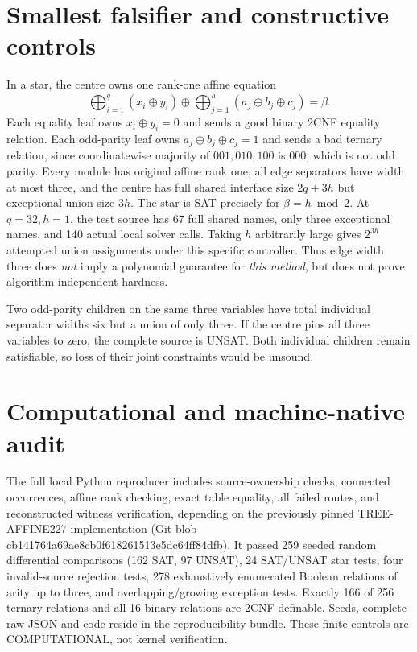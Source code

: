 \documentclass[11pt]{article}
\begin{document}
\section{Smallest falsifier and constructive controls}
In a star, the centre owns one rank-one affine equation
\[
 \bigoplus_{i=1}^q(x_i\oplus y_i)
 \oplus \bigoplus_{j=1}^h(a_j\oplus b_j\oplus c_j)=\beta.
\]
Each equality leaf owns $x_i\oplus y_i=0$ and sends a good binary 2CNF equality relation. Each odd-parity leaf owns $a_j\oplus b_j\oplus c_j=1$ and sends a bad ternary relation, since coordinatewise majority of $001,010,100$ is $000$, which is not odd parity. Every module has original affine rank one, all edge separators have width at most three, and the centre has full shared interface size $2q+3h$ but exceptional union size $3h$. The star is SAT precisely for $\beta=h\bmod2$. At $q=32,h=1$, the test source has 67 full shared names, only three exceptional names, and 140 actual local solver calls. Taking $h$ arbitrarily large gives $2^{3h}$ attempted union assignments under this specific controller. Thus edge width three does \emph{not} imply a polynomial guarantee for \emph{this method}, but does not prove algorithm-independent hardness.

Two odd-parity children on the same three variables have total individual separator widths six but a union of only three. If the centre pins all three variables to zero, the complete source is UNSAT. Both individual children remain satisfiable, so loss of their joint constraints would be unsound.

\section{Computational and machine-native audit}
The full local Python reproducer includes source-ownership checks, connected occurrences, affine rank checking, exact table equality, all failed routes, and reconstructed witness verification, depending on the previously pinned TREE-AFFINE227 implementation (Git blob cb141764a69ae8cb0f618261513e5dc64ff84dfb). It passed 259 seeded random differential comparisons (162 SAT, 97 UNSAT), 24 SAT/UNSAT star tests, four invalid-source rejection tests, 278 exhaustively enumerated Boolean relations of arity up to three, and overlapping/growing exception tests. Exactly 166 of 256 ternary relations and all 16 binary relations are 2CNF-definable. Seeds, complete raw JSON and code reside in the reproducibility bundle. These finite controls are COMPUTATIONAL, not kernel verification.
\end{document}
